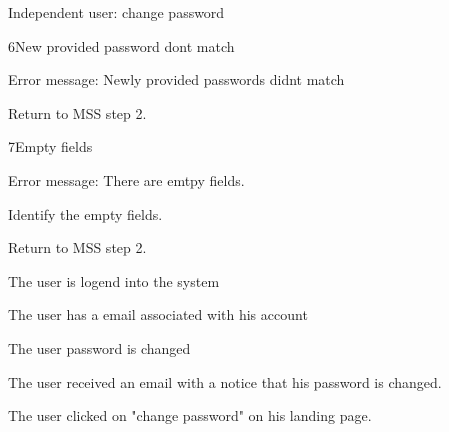 \begin{uc}{Independent user: change password}
\begin{uc-ext}
        \begin{uc-fail}{6}{New provided password dont match}
        \item Error message: Newly provided passwords didnt match
        \item Return to MSS step 2.
        \end{uc-fail}
	
		\begin{uc-fail}{7}{Empty fields}
		\item Error message: There are emtpy fields.
		\item Identify the empty fields.
		\item Return to MSS step 2.
		\end{uc-fail}
    \end{uc-ext}

    \begin{uc-pre}
    \item The user is logend into the system
    \item The user has a email associated with his account
    \end{uc-pre}

    \begin{uc-post}
    \item The user password is changed
    \item The user received an email with a notice that his password is changed.
    \end{uc-post}

    \begin{uc-trig}
        The user clicked on "change password" on his landing page.
    \end{uc-trig}

\end{uc}
